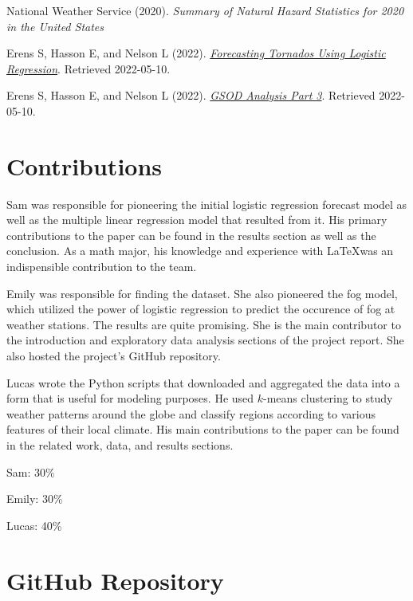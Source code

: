 \documentclass[conference]{IEEEtran}
\begin{document}
\begin{thebibliography}{9}
National Weather Service (2020). \textit{Summary of Natural Hazard Statistics for 2020 in the United States}

Erens S, Hasson E, and Nelson L (2022). \href{https://github.com/emilyhasson/gsod-analysis/blob/main/code/gsod-analysis-part-2.ipynb}{\textit{Forecasting Tornados Using Logistic Regression}}. Retrieved 2022-05-10.

Erens S, Hasson E, and Nelson L (2022). \href{https://github.com/emilyhasson/gsod-analysis/blob/main/code/gsod-analysis-part-3.ipynb}{\textit{GSOD Analysis Part 3}}. Retrieved 2022-05-10.

\end{thebibliography}

\section{Contributions}

Sam was responsible for pioneering the initial logistic regression forecast model as well as the multiple linear regression model that resulted from it. His primary contributions to the paper can be found in the results section as well as the conclusion. As a math major, his knowledge and experience with \LaTeX was an indispensible contribution to the team.

Emily was responsible for finding the dataset. She also pioneered the fog model, which utilized the power of logistic regression to predict the occurence of fog at weather stations. The results are quite promising. She is the main contributor to the introduction and exploratory data analysis sections of the project report. She also hosted the project's GitHub repository.

Lucas wrote the Python scripts that downloaded and aggregated the data into a form that is useful for modeling purposes. He used $k$-means clustering to study weather patterns around the globe and classify regions according to various features of their local climate. His main contributions to the paper can be found in the related work, data, and results sections.

Sam: 30\%

Emily: 30\%

Lucas: 40\%

\section{GitHub Repository}
\end{document}
